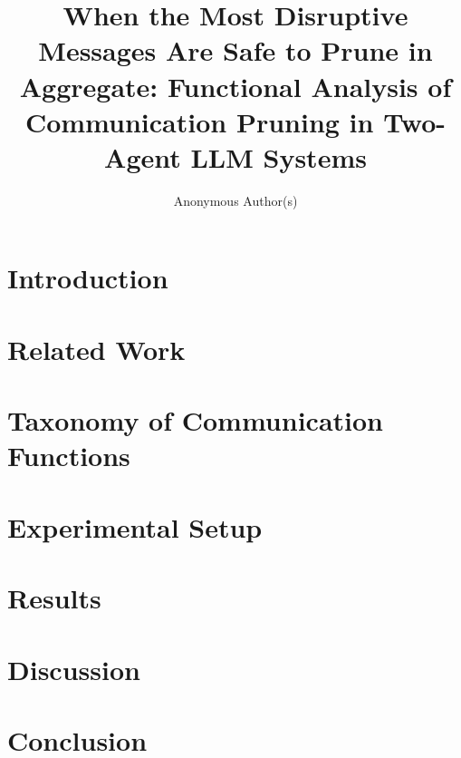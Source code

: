 \documentclass{article}
\title{When the Most Disruptive Messages Are Safe to Prune in Aggregate: Functional Analysis of Communication Pruning in Two-Agent LLM Systems}
\author{
  Anonymous Author(s)
}
\begin{document}
\maketitle

\begin{abstract}

\end{abstract}

\section{Introduction}
\label{sec:introduction}


\section{Related Work}
\label{sec:related_work}


\section{Taxonomy of Communication Functions}
\label{sec:taxonomy}


\section{Experimental Setup}
\label{sec:methodology}



\section{Results}
\label{sec:results}


\section{Discussion}
\label{sec:discussion}


\section{Conclusion}
\label{sec:conclusion}





\appendix









\end{document}
